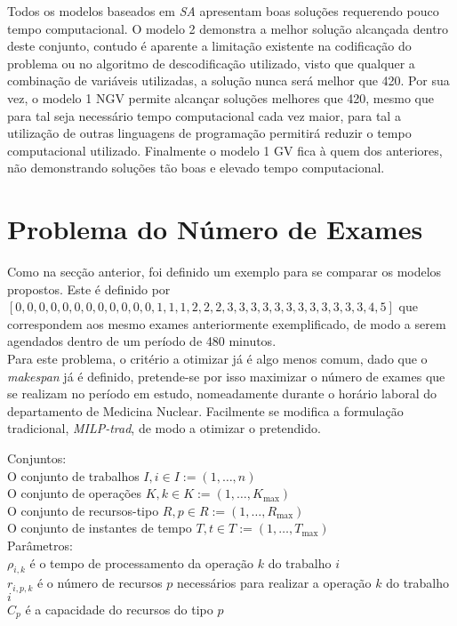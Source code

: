 Todos os modelos baseados em \textit{SA} apresentam boas soluções requerendo pouco tempo computacional. O modelo 2 demonstra a melhor solução alcançada dentro deste conjunto, contudo é aparente a limitação existente na codificação do problema ou no algoritmo de descodificação utilizado, visto que qualquer a combinação de variáveis utilizadas, a solução nunca será melhor que 420. Por sua vez, o modelo 1 NGV permite alcançar soluções melhores que 420, mesmo que para tal seja necessário tempo computacional cada vez maior, para tal a utilização de outras linguagens de programação permitirá reduzir o tempo computacional utilizado. Finalmente o modelo 1 GV fica à quem dos anteriores, não demonstrando soluções tão boas e elevado tempo computacional.\\

\section{Problema do Número de Exames}

Como na secção anterior, foi definido um exemplo para se comparar os modelos propostos. Este é definido por $[0, 0, 0, 0, 0, 0, 0, 0, 0, 0, 0, 0, 1, 1, 1, 2, 2, 2, 3, 3, 3, 3, 3, 3, 3, 3, 3, 3, 3, 3, 4, 5]$ que correspondem aos mesmo exames anteriormente exemplificado, de modo a serem agendados dentro de um período de 480 minutos.\\

Para este problema, o critério a otimizar já é algo menos comum, dado que o \textit{makespan} já é definido, pretende-se por isso maximizar o número de exames que se realizam no período em estudo, nomeadamente durante o horário laboral do departamento de Medicina Nuclear. Facilmente se modifica a formulação tradicional, \textit{MILP-trad}, de modo a otimizar o pretendido.

Conjuntos:\\
O conjunto de trabalhos $I, i \in I := (1, \ldots, n)$ \\
O conjunto de operações $K, k \in K := (1, \ldots, K_{\max})$ \\
O conjunto de recursos-tipo $R, p \in R := (1, \ldots, R_{\max})$ \\
O conjunto de instantes de tempo $T, t \in T := (1, \ldots, T_{\max})$ \\

Parâmetros:\\
$\rho_{i,k}$ é o tempo de processamento da operação $k$ do trabalho $i$ \\
$r_{i,p,k}$ é o número de recursos $p$ necessários para realizar a operação $k$ do trabalho $i$ \\
$C_{p}$ é a capacidade do recursos do tipo $p$ \\

